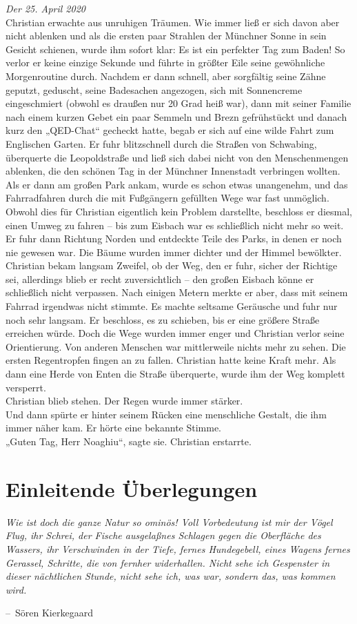 \documentclass[oneside]{memoir}
\makeatletter
\newenvironment{chapquote}[2][2em]
  {\setlength{\@tempdima}{#1}%
   \def\chapquote@author{#2}%
   \parshape 1 \@tempdima \dimexpr\textwidth-2\@tempdima\relax%
   \itshape}
  {\par\normalfont\hfill--\ \chapquote@author\hspace*{\@tempdima}\par\bigskip}
\makeatother
\begin{document}
\textit{Der 25. April 2020} \\
Christian erwachte aus unruhigen Träumen. Wie immer ließ er sich davon aber nicht ablenken und als die ersten paar Strahlen der Münchner Sonne in sein Gesicht schienen, wurde ihm sofort klar: Es ist ein perfekter Tag zum Baden!
So verlor er keine einzige Sekunde und führte in größter Eile seine gewöhnliche Morgenroutine durch.
Nachdem er dann schnell, aber sorgfältig seine Zähne geputzt, geduscht, seine Badesachen angezogen, sich mit Sonnencreme eingeschmiert (obwohl es draußen nur 20 Grad heiß war), dann mit seiner Familie nach einem kurzen Gebet ein paar Semmeln und Brezn gefrühstückt und danach kurz den „QED-Chat“ gecheckt hatte, begab er sich auf eine wilde Fahrt zum Englischen Garten.
Er fuhr blitzschnell durch die Straßen von Schwabing, überquerte die Leopoldstraße und ließ sich dabei nicht von den Menschenmengen ablenken, die den schönen Tag in der Münchner Innenstadt verbringen wollten. Als er dann am großen Park ankam, wurde es schon etwas unangenehm, und das Fahrradfahren durch die mit Fußgängern gefüllten Wege war fast unmöglich. Obwohl dies für Christian eigentlich kein Problem darstellte, beschloss er diesmal, einen Umweg zu fahren -- bis zum Eisbach war es schließlich nicht mehr so weit.
Er fuhr dann Richtung Norden und entdeckte Teile des Parks, in denen er noch nie gewesen war. Die Bäume wurden immer dichter und der Himmel bewölkter. Christian bekam langsam Zweifel, ob der Weg, den er fuhr, sicher der Richtige sei, allerdings blieb er recht zuversichtlich -- den großen Eisbach könne er schließlich nicht verpassen.
Nach einigen Metern merkte er aber, dass mit seinem Fahrrad irgendwas nicht stimmte. Es machte seltsame Geräusche und fuhr nur noch sehr langsam. Er beschloss, es zu schieben, bis er eine größere Straße erreichen würde. Doch die Wege wurden immer enger und Christian verlor seine Orientierung. Von anderen Menschen war mittlerweile nichts mehr zu sehen. Die ersten Regentropfen fingen an zu fallen.
Christian hatte keine Kraft mehr. Als dann eine Herde von Enten die Straße überquerte, wurde ihm der Weg komplett versperrt.  \\
Christian blieb stehen.
Der Regen wurde immer stärker. \\
Und dann spürte er hinter seinem Rücken eine menschliche Gestalt, die ihm immer näher kam.
Er hörte eine bekannte Stimme. \\
„Guten Tag, Herr Noaghiu“, sagte sie.
Christian erstarrte.
 

\chapter{Einleitende Überlegungen} %
\begin{chapquote}{Sören Kierkegaard}
\glqq Wie ist doch die ganze Natur so ominös! Voll Vorbedeutung ist mir der Vögel Flug, ihr Schrei, der Fische ausgelaßnes Schlagen gegen die Oberfläche des Wassers, ihr Verschwinden in der Tiefe, fernes Hundegebell, eines Wagens fernes Gerassel, Schritte, die von fernher widerhallen. Nicht sehe ich Gespenster in dieser nächtlichen Stunde, nicht sehe ich, was war, sondern das, was kommen wird.\grqq
\end{chapquote}
\end{document}
